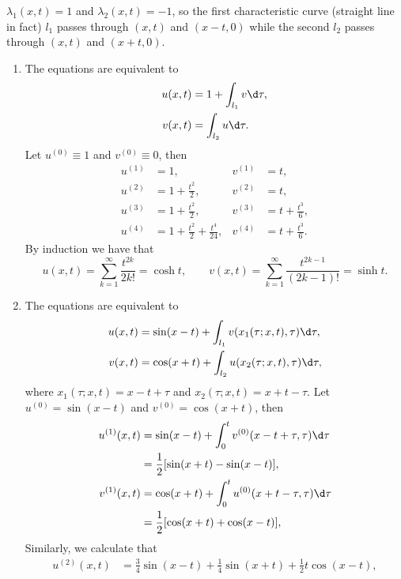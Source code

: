 \begin{solution}
  $\lambda_1(x,t) = 1$ and $\lambda_2(x,t)=-1$, so the first characteristic curve (straight line in fact) $l_1$
  passes through $(x,t)$ and $(x-t,0)$ while the second $l_2$ passes through $(x,t)$ and $(x+t,0)$.
  \begin{enumerate}[(1)]
    \item The equations are equivalent to
      \begin{align*}
        u(x,t) & = 1 + \int_{l_1} v \d\tau, \\
        v(x,t) & = \int_{l_2} u \d\tau.
      \end{align*}
      Let $u^{(0)}\equiv 1$ and $v^{(0)}\equiv 0$, then
      \begin{align*}
        u^{(1)} & = 1, & v^{(1)} & = t, \\
        u^{(2)} & = 1+\frac{t^2}{2}, & v^{(2)} & = t, \\
        u^{(3)} & = 1+\frac{t^2}{2}, & v^{(3)} & = t+\frac{t^3}{6}, \\
        u^{(4)} & = 1+\frac{t^2}{2}+\frac{t^4}{24}, & v^{(4)} & = t+\frac{t^3}{6}.
      \end{align*}
      By induction we have that
      \[ u(x,t) = \sum_{k=1}^\infty \frac{t^{2k}}{2k!} = \cosh t,
          \qquad v(x,t) = \sum_{k=1}^\infty \frac{t^{2k-1}}{(2k-1)!} = \sinh t. \]
    \item The equations are equivalent to
      \begin{align*}
        u(x,t) & = \sin(x-t) + \int_{l_1} v(x_1(\tau;x,t),\tau) \d\tau, \\
        v(x,t) & = \cos(x+t) + \int_{l_2} u(x_2(\tau;x,t),\tau) \d\tau,
      \end{align*}
      where $x_1(\tau;x,t) = x-t+\tau$ and $x_2(\tau;x,t) = x+t-\tau$.
      Let $u^{(0)} = \sin(x-t)$ and $v^{(0)} = \cos(x+t)$, then
      \begin{align*}
        u^{(1)}(x,t) & = \sin(x-t) + \int_0^t v^{(0)} (x-t+\tau,\tau) \d\tau \\
                     & = \frac{1}{2}[\sin(x+t) - \sin(x-t)], \\
        v^{(1)}(x,t) & = \cos(x+t) + \int_0^t u^{(0)} (x+t-\tau,\tau) \d\tau \\
                     & = \frac{1}{2} [\cos(x+t) + \cos(x-t)],
      \end{align*}
      Similarly, we calculate that
      \begin{align*}
        u^{(2)}(x,t) & = \frac34 \sin(x-t) + \frac14 \sin(x+t) + \frac12 t\cos(x-t), \\

\end{align*}
\end{enumerate}
\end{solution}
